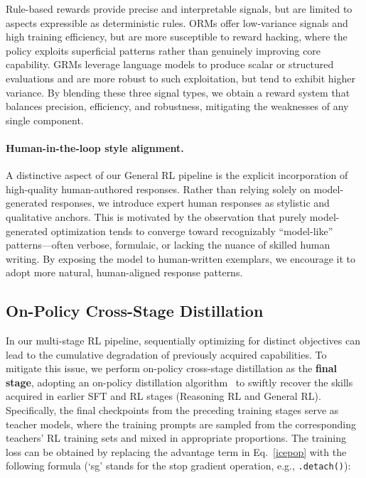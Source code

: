 Rule-based rewards provide precise and interpretable signals, but are limited to aspects expressible as deterministic rules. ORMs offer low-variance signals and high training efficiency, but are more susceptible to reward hacking, where the policy exploits superficial patterns rather than genuinely improving core capability. GRMs leverage language models to produce scalar or structured evaluations and are more robust to such exploitation, but tend to exhibit higher variance. By blending these three signal types, we obtain a reward system that balances precision, efficiency, and robustness, mitigating the weaknesses of any single component.

\paragraph{Human-in-the-loop style alignment.}
A distinctive aspect of our General RL pipeline is the explicit incorporation of high-quality human-authored responses. Rather than relying solely on model-generated responses, we introduce expert human responses as stylistic and qualitative anchors. This is motivated by the observation that purely model-generated optimization tends to converge toward recognizably ``model-like'' patterns---often verbose, formulaic, or lacking the nuance of skilled human writing. By exposing the model to human-written exemplars, we encourage it to adopt more natural, human-aligned response patterns.

\subsection{On-Policy Cross-Stage Distillation}
In our multi-stage RL pipeline, sequentially optimizing for distinct objectives can lead to the cumulative degradation of previously acquired capabilities. To mitigate this issue, we perform on-policy cross-stage distillation as the \textbf{final stage}, adopting an on-policy distillation algorithm~\cite{guminillm,qwen3,xiao2026mimov2flashtechnicalreport,lu2025onpolicydistillation} to swiftly recover the skills acquired in earlier SFT and RL stages (Reasoning RL and General RL). Specifically, the final checkpoints from the preceding training stages serve as teacher models, where the training prompts are sampled from the corresponding teachers' RL training sets and mixed in appropriate proportions. The training loss can be obtained by replacing the advantage term in Eq.~\ref{icepop} with the following formula (`sg' stands for the stop gradient operation, e.g., \texttt{.detach()}):


